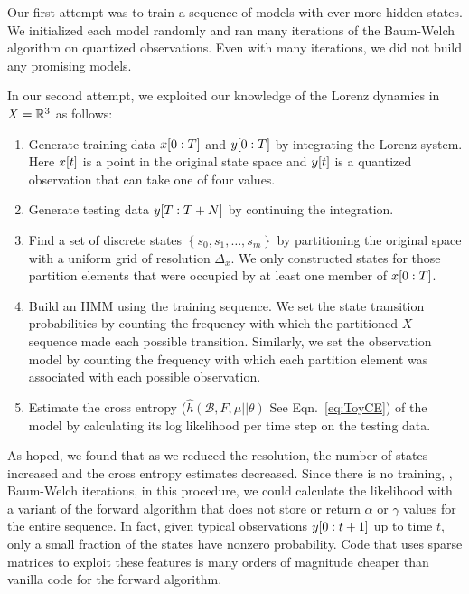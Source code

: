 Our first attempt was to train a sequence of models with ever more
hidden states.  We initialized each model randomly and ran many
iterations of the Baum-Welch algorithm on quantized observations.
Even with many iterations, we did not build any promising models.

In our second attempt, we exploited our knowledge of the Lorenz
dynamics in $X=\mathbb{R}^3$ as follows:
\begin{enumerate}
\item Generate training data $x[0:T]$ and $y[0:T]$ by
  integrating the Lorenz system.  Here ${x}{[t]}$ is a point in the
  original state space and ${y}{[t]}$ is a quantized observation that
  can take one of four values.
\item Generate testing data $y[T:T+N]$ by continuing the integration.
\item Find a set of discrete states $\left\{s_0, s_1, \ldots,
    s_m\right\}$ by partitioning the original space with a uniform
  grid of resolution $\Delta_x$.  We only constructed states for those
  partition elements that were occupied by at least one member of
  $x[0:T]$.
\item Build an HMM using the training sequence.  We set the state
  transition probabilities by counting the frequency with which the
  partitioned $X$ sequence made each possible transition.  Similarly,
  we set the observation model by counting the frequency with which
  each partition element was associated with each possible
  observation.
\item Estimate the cross entropy ($ \hat h(\mathcal{B},F,\mu||\theta)$
  See Eqn.~\eqref{eq:ToyCE}) of the model by calculating its
  log likelihood per time step on the testing data.
\end{enumerate}

As hoped, we found that as we reduced the resolution, the number of
states increased and the cross entropy estimates decreased.  Since
there is no training, \ie, Baum-Welch iterations, in this procedure,
we could calculate the likelihood with a variant of the forward
algorithm that does not store or return $\alpha$ or $\gamma$ values
for the entire sequence.  In fact, given typical observations
$y[0:t+1]$ up to time $t$, only a small fraction of the states
have nonzero probability.  Code that uses sparse matrices to exploit
these features is many orders of magnitude cheaper than vanilla code
for the forward algorithm.

